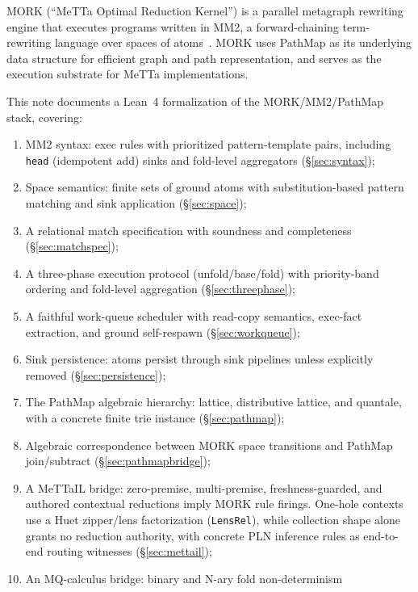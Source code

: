 \documentclass[11pt]{article}
\theoremstyle{definition}
\theoremstyle{remark}
\newcommand{\MORK}{\textup{MORK}}
\newcommand{\MeTTa}{\textup{MeTTa}}
\newcommand{\MeTTaIL}{\textup{MeTTaIL}}
\newcommand{\PathMap}{\textup{PathMap}}
\begin{document}
\MORK{} (``\MeTTa{} Optimal Reduction Kernel'') is a parallel metagraph
rewriting engine that executes programs written in MM2, a forward-chaining
term-rewriting language over spaces of atoms~\cite{MeredithStayOSLF2020}.
\MORK{} uses \PathMap{} as its underlying data structure for efficient
graph and path representation, and serves as the execution substrate for
\MeTTa{} implementations.

This note documents a Lean~4 formalization of the \MORK{}/MM2/\PathMap{} stack,
covering:
\begin{enumerate}[nosep]
  \item MM2 syntax: exec rules with prioritized pattern-template pairs,
        including \texttt{head} (idempotent add) sinks and fold-level
        aggregators (\S\ref{sec:syntax});
  \item Space semantics: finite sets of ground atoms with substitution-based
        pattern matching and sink application (\S\ref{sec:space});
  \item A relational match specification with soundness and completeness
        (\S\ref{sec:matchspec});
  \item A three-phase execution protocol (unfold/base/fold) with
        priority-band ordering and fold-level aggregation
        (\S\ref{sec:threephase});
  \item A faithful work-queue scheduler with read-copy semantics, exec-fact
        extraction, and ground self-respawn (\S\ref{sec:workqueue});
  \item Sink persistence: atoms persist through sink pipelines unless
        explicitly removed (\S\ref{sec:persistence});
  \item The \PathMap{} algebraic hierarchy: lattice, distributive lattice,
        and quantale, with a concrete finite trie instance (\S\ref{sec:pathmap});
  \item Algebraic correspondence between \MORK{} space transitions and
        \PathMap{} join/subtract (\S\ref{sec:pathmapbridge});
  \item A \MeTTaIL{} bridge: zero-premise, multi-premise,
        freshness-guarded, and authored contextual reductions imply \MORK{}
        rule firings.  One-hole contexts use a Huet zipper/lens factorization
        (\texttt{LensRel}), while collection shape alone grants no reduction
        authority, with
        concrete PLN inference rules as end-to-end
        routing witnesses (\S\ref{sec:mettail});
  \item An MQ-calculus bridge: binary and N-ary fold non-determinism

\end{enumerate}
\end{document}
